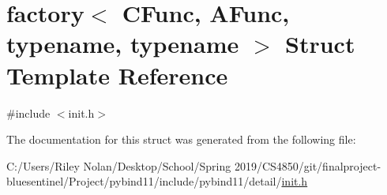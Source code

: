 \hypertarget{structfactory}{}\section{factory$<$ C\+Func, A\+Func, typename, typename $>$ Struct Template Reference}
\label{structfactory}


{\ttfamily \#include $<$init.\+h$>$}



The documentation for this struct was generated from the following file\+:\begin{DoxyCompactItemize}
\item 
C\+:/\+Users/\+Riley Nolan/\+Desktop/\+School/\+Spring 2019/\+C\+S4850/git/finalproject-\/bluesentinel/\+Project/pybind11/include/pybind11/detail/\mbox{\hyperlink{init_8h}{init.\+h}}\end{DoxyCompactItemize}
